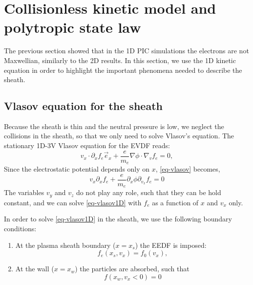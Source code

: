 
\section{Collisionless kinetic model and polytropic state law}
  \label{sec-kinetic}


  The previous section showed that in the \ac{1D} \ac{PIC} simulations the electrons are not Maxwellian, similarly to the \ac{2D} results.
  In this section, we use the 1D kinetic equation in order to highlight the important phenomena needed to describe the sheath.
  
  \subsection{Vlasov equation for the sheath}

    Because the sheath is thin and the neutral pressure is low, we neglect the collisions in the sheath, so that we only need to solve Vlasov's equation.
    The stationary 1D-3V Vlasov equation for the EVDF reads\string:
    \begin{equation}\label{eq-vlasov}
      v_x \cdot \partial_x f_e \vec{e}_x + \frac{e}{m_e} \nabla \phi \cdot \nabla_v f_e = 0,
    \end{equation}
    Since the electrostatic potential depends only on $x$, \cref{eq-vlasov} becomes,
    \begin{equation}
    v_x \partial_x f_e +  \frac{e}{m_e}\partial_x\phi \partial_{v_x} f_e = 0
    \label{eq-vlasov1D}
    \end{equation}
    The variables $v_y$ and $v_z$ do not play any role, such that they can be hold constant, and we can solve \cref{eq-vlasov1D} with $f_e$ as a function of $x$ and $v_x$ only.

    In order to solve \cref{eq-vlasov1D} in the sheath,  we use the following boundary conditions\string:
      \begin{enumerate}
    \item At the plasma sheath boundary ($x=x_s$) the EEDF is imposed\string:
    \begin{equation}
    f_e(x_s, v_x) = f_0(v_x),
    \label{eq-plasma_BC}
    \end{equation}
    \item At the wall ($x=x_w$) the particles are absorbed, such that
    \begin{equation}
    f(x_w, v_x<0) = 0
    \label{eq-wall_BC}
    \end{equation}
    \end{enumerate}

